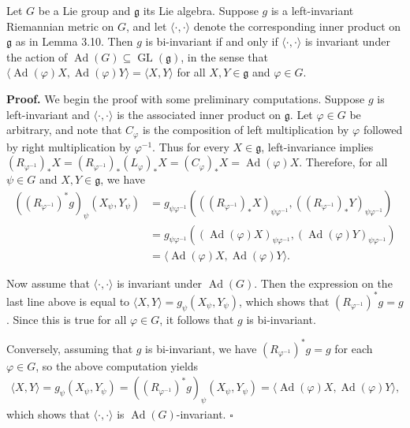 \begin{proposition}
\label{prop:bi-invariant-metric-adjoint}

Let $G$ be a Lie group and $\mathfrak{g}$ its Lie algebra. Suppose $g$ is a left-invariant Riemannian metric on $G$, and let $\langle \cdot, \cdot \rangle$ denote the corresponding inner product on $\mathfrak{g}$ as in Lemma 3.10. Then $g$ is bi-invariant if and only if $\langle \cdot, \cdot \rangle$ is invariant under the action of $\operatorname{Ad}(G) \subseteq \operatorname{GL}(\mathfrak{g})$, in the sense that $\langle \operatorname{Ad}(\varphi)X, \operatorname{Ad}(\varphi)Y \rangle = \langle X, Y \rangle$ for all $X, Y \in \mathfrak{g}$ and $\varphi \in G$.

\textbf{Proof.} We begin the proof with some preliminary computations. Suppose $g$ is left-invariant and $\langle \cdot, \cdot \rangle$ is the associated inner product on $\mathfrak{g}$. Let $\varphi \in G$ be arbitrary, and note that $C_\varphi$ is the composition of left multiplication by $\varphi$ followed by right multiplication by $\varphi^{-1}$. Thus for every $X \in \mathfrak{g}$, left-invariance implies $(R_{\varphi^{-1}})_* X = (R_{\varphi^{-1}})_* (L_\varphi)_* X = (C_\varphi)_* X = \operatorname{Ad}(\varphi)X$. Therefore, for all $\psi \in G$ and $X, Y \in \mathfrak{g}$, we have
\begin{align*}
((R_{\varphi^{-1}})^* g)_\psi (X_\psi, Y_\psi) &= g_{\psi\varphi^{-1}} (((R_{\varphi^{-1}})_* X)_{\psi\varphi^{-1}}, ((R_{\varphi^{-1}})_* Y)_{\psi\varphi^{-1}}) \\
&= g_{\psi\varphi^{-1}} ((\operatorname{Ad}(\varphi)X)_{\psi\varphi^{-1}}, (\operatorname{Ad}(\varphi)Y)_{\psi\varphi^{-1}}) \\
&= \langle \operatorname{Ad}(\varphi)X, \operatorname{Ad}(\varphi)Y \rangle.
\end{align*}

Now assume that $\langle \cdot, \cdot \rangle$ is invariant under $\operatorname{Ad}(G)$. Then the expression on the last line above is equal to $\langle X, Y \rangle = g_\psi(X_\psi, Y_\psi)$, which shows that $(R_{\varphi^{-1}})^* g = g$. Since this is true for all $\varphi \in G$, it follows that $g$ is bi-invariant.

Conversely, assuming that $g$ is bi-invariant, we have $(R_{\varphi^{-1}})^* g = g$ for each $\varphi \in G$, so the above computation yields
\begin{align*}
\langle X, Y \rangle = g_\psi(X_\psi, Y_\psi) = ((R_{\varphi^{-1}})^* g)_\psi(X_\psi, Y_\psi) = \langle \operatorname{Ad}(\varphi)X, \operatorname{Ad}(\varphi)Y \rangle,
\end{align*}
which shows that $\langle \cdot, \cdot \rangle$ is $\operatorname{Ad}(G)$-invariant. \quad $\square$

\end{proposition}

